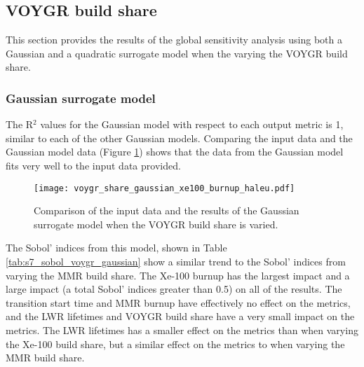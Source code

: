\subsection{VOYGR build share}
This section provides the results of the global sensitivity analysis using 
both a Gaussian and a quadratic surrogate model when the varying the 
VOYGR build share. 

\subsubsection{Gaussian surrogate model}
The R$^2$ values for the Gaussian model with respect to 
each output metric is 1, similar to each of the other Gaussian 
models. Comparing the input data and the Gaussian model data 
(Figure \ref{fig:s7_voygr_gaussian}) shows that the data from the 
Gaussian model fits very well to the input data provided. 

\begin{figure}[h!]
    \centering 
    \texttt{[image: voygr\_share\_gaussian\_xe100\_burnup\_haleu.pdf]}
    \caption{Comparison of the input data and the results of the Gaussian 
    surrogate model when the VOYGR build share is varied.}
    \label{fig:s7_voygr_gaussian}
\end{figure}

The Sobol' indices from this model, shown in Table \ref{tab:s7_sobol_voygr_gaussian}
show a similar trend to the Sobol' indices from varying the \gls{MMR}
build share. The Xe-100 burnup has the largest impact and a large impact 
(a total Sobol' indices greater than 0.5) on all of the 
results. The transition start time and \gls{MMR} burnup have effectively no 
effect on the metrics, and the \gls{LWR} lifetimes and VOYGR build share 
have a very small impact on the metrics. The \gls{LWR} lifetimes has a smaller 
effect on the metrics than when varying the Xe-100 build share, but a similar 
effect on the metrics to when varying the \gls{MMR} build share. 

